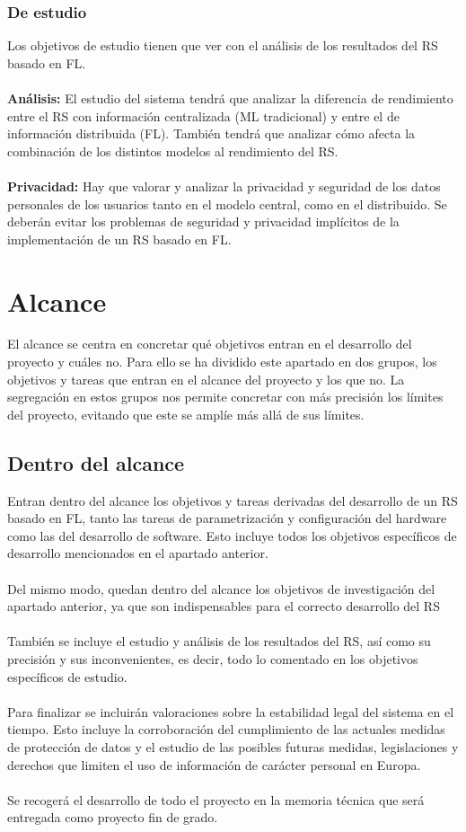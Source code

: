 \subsubsection{De estudio}
Los objetivos de estudio tienen que ver con el análisis de los resultados del RS basado en FL.
\\ \\
\textbf{Análisis: }
El estudio del sistema tendrá que analizar la diferencia de rendimiento entre el RS con información centralizada (ML tradicional) y entre el de información distribuida (FL). También tendrá que analizar cómo afecta la combinación de los distintos modelos al rendimiento del RS.
\\ \\
\textbf{Privacidad: }
Hay que valorar y analizar la privacidad y seguridad de los datos personales de los usuarios tanto en el modelo central, como en el distribuido. Se deberán evitar los problemas de seguridad y privacidad implícitos de la implementación de un RS basado en FL.

\section{Alcance}
El alcance se centra en concretar qué objetivos entran en el desarrollo del proyecto y cuáles no. Para ello se ha dividido este apartado en dos grupos, los objetivos y tareas que entran en el alcance del proyecto y los que no. La segregación en estos grupos nos permite concretar con más precisión los límites del proyecto, evitando que este se amplíe más allá de sus límites. 

\subsection{Dentro del alcance}
Entran dentro del alcance los objetivos y tareas derivadas del desarrollo de un RS basado en FL, tanto las tareas de parametrización y configuración del hardware como las del desarrollo de software. Esto incluye todos los objetivos específicos de desarrollo mencionados en el apartado anterior.
\\ \\
Del mismo modo, quedan dentro del alcance los objetivos de investigación del apartado anterior, ya que son indispensables para el correcto desarrollo del RS
\\ \\
También se incluye el estudio y análisis de los resultados del RS, así como su precisión y sus inconvenientes, es decir, todo lo comentado en los objetivos específicos de estudio.
\\ \\
Para finalizar se incluirán valoraciones sobre la estabilidad legal del sistema en el tiempo. Esto incluye la corroboración del cumplimiento de las actuales medidas de protección de datos y el estudio de las posibles futuras medidas, legislaciones y derechos que limiten el uso de información de carácter personal en Europa.
\\ \\
Se recogerá el desarrollo de todo el proyecto en la memoria técnica que será entregada como proyecto fin de grado.

